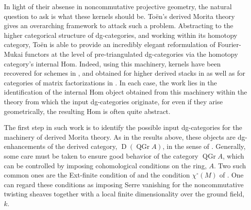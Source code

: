 \documentclass[11pt]{article}
\begin{document}
In light of their absense in noncommutative projective geometry, the natural question to ask is what these kernels should be.
To\"en's derived Morita theory \cite{Toen} gives an overarching framework to attack such a problem.
Abstracting to the higher categorical structure of dg-categories, and working within its homotopy category, To\"en is able to provide an incredibly elegant reformulation of Fourier-Mukai functors at the level of pre-triangulated dg-categories via the homotopy category's internal Hom.
Indeed, using this machinery, kernels have been recovered for schemes in \cite{Toen}, and obtained for higher derived stacks in \cite{BFN} as well as for categories of matrix factorizations in \cite{dyck,PV,BFK}.
In each case, the work lies in the identification of the internal Hom object obtained from this machinery within the theory from which the input dg-categories originate, for even if they arise geometrically, the resulting Hom is often quite abstract.


The first step in such work is to identify the possible input dg-categories for the machinery of derived Morita theory.
As in the results above, these objects are dg-enhancements of the derived category, $\operatorname{D}(\operatorname{QGr} A)$, in the sense of \cite{Lunts-Orlov}.
Generally, some care must be taken to ensure good behavior of the category $\operatorname{QGr} A$, which can be controlled by imposing cohomological conditions on the ring, $A$.
Two such common ones are the Ext-finite condition of \cite{BVdB} and the condition $\chi^\circ(M)$ of \cite{AZ94}.
One can regard these conditions as imposing Serre vanishing for the noncommutative twisting sheaves together with a local finite dimensionality over the ground field, $k$.
\end{document}
